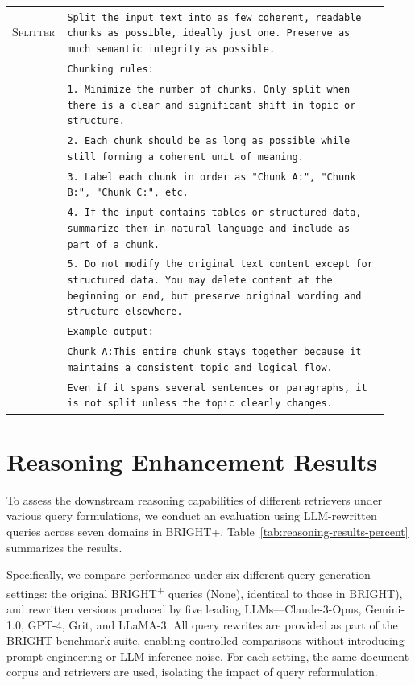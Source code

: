 \documentclass[11pt]{article}
\begin{document}
\begin{table}[h]
\begin{tabular}{p{0.1\linewidth} | p{0.83\linewidth}}
\textsc{Splitter} &
\texttt{Split the input text into as few coherent, readable chunks as possible, ideally just one. Preserve as much semantic integrity as possible.} \\
& \texttt{Chunking rules:} \\
& \texttt{1. Minimize the number of chunks. Only split when there is a clear and significant shift in topic or structure.} \\
& \texttt{2. Each chunk should be as long as possible while still forming a coherent unit of meaning.} \\
& \texttt{3. Label each chunk in order as "Chunk A:", "Chunk B:", "Chunk C:", etc.} \\
& \texttt{4. If the input contains tables or structured data, summarize them in natural language and include as part of a chunk.} \\
& \texttt{5. Do not modify the original text content except for structured data. You may delete content at the beginning or end, but preserve original wording and structure elsewhere.} \\
& \texttt{Example output:} \\
& \texttt{Chunk A:\newline This entire chunk stays together because it maintains a consistent topic and logical flow.} \\
& \texttt{Even if it spans several sentences or paragraphs, it is not split unless the topic clearly changes.} \\
\bottomrule
\end{tabular}
\end{table}


\clearpage 
\section{Reasoning Enhancement Results}
\label{app:reason}
To assess the downstream reasoning capabilities of different retrievers under various query formulations, we conduct an evaluation using LLM-rewritten queries across seven domains in BRIGHT+. Table~\ref{tab:reasoning-results-percent} summarizes the results.

Specifically, we compare performance under six different query-generation settings: the original BRIGHT\textsuperscript{+} queries (None), identical to those in BRIGHT), and rewritten versions produced by five leading LLMs—Claude-3-Opus, Gemini-1.0, GPT-4, Grit, and LLaMA-3. All query rewrites are provided as part of the BRIGHT benchmark suite, enabling controlled comparisons without introducing prompt engineering or LLM inference noise. For each setting, the same document corpus and retrievers are used, isolating the impact of query reformulation.
\end{document}
